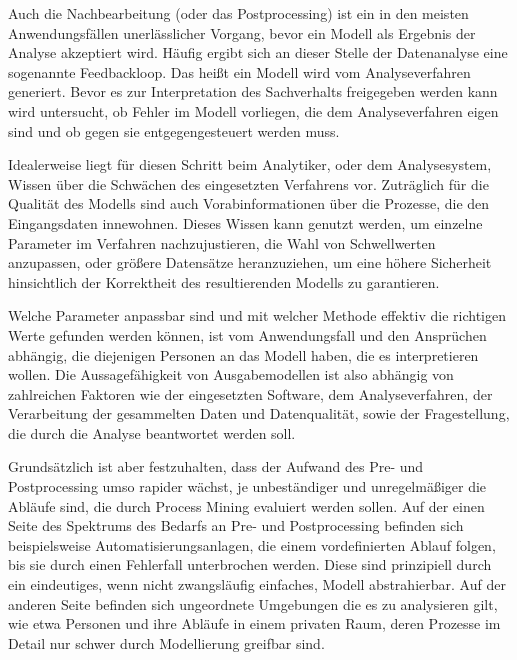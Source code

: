 Auch die Nachbearbeitung (oder das Postprocessing) ist ein in den meisten Anwendungsfällen unerlässlicher Vorgang, bevor ein  Modell als Ergebnis der Analyse akzeptiert wird. Häufig ergibt sich an dieser Stelle der Datenanalyse eine sogenannte Feedbackloop. Das heißt ein Modell wird vom Analyseverfahren generiert. Bevor es zur Interpretation des Sachverhalts freigegeben werden kann wird untersucht, ob Fehler im Modell vorliegen, die dem Analyseverfahren eigen sind und ob gegen sie entgegengesteuert werden muss. 

Idealerweise liegt für diesen Schritt beim Analytiker, oder dem Analysesystem, Wissen über die Schwächen des eingesetzten Verfahrens vor. Zuträglich für die Qualität des Modells sind auch Vorabinformationen über die Prozesse, die den Eingangsdaten innewohnen. Dieses Wissen kann genutzt werden, um einzelne Parameter im Verfahren nachzujustieren, die Wahl von Schwellwerten anzupassen, oder größere Datensätze heranzuziehen, um eine höhere Sicherheit hinsichtlich der Korrektheit des resultierenden Modells zu garantieren.

Welche Parameter anpassbar sind und mit welcher Methode effektiv die richtigen Werte gefunden werden können, ist vom Anwendungsfall und den Ansprüchen abhängig, die diejenigen Personen an das Modell haben, die es interpretieren wollen. Die Aussagefähigkeit von Ausgabemodellen ist also abhängig von zahlreichen Faktoren wie der eingesetzten Software, dem Analyseverfahren, der Verarbeitung der gesammelten Daten und Datenqualität, sowie der Fragestellung, die durch die Analyse beantwortet werden soll.

Grundsätzlich ist aber festzuhalten, dass der Aufwand des Pre- und Postprocessing umso rapider wächst, je unbeständiger und unregelmäßiger die Abläufe sind, die durch Process Mining evaluiert werden sollen. Auf der einen Seite des Spektrums des Bedarfs an Pre- und Postprocessing befinden sich  beispielsweise Automatisierungsanlagen, die einem vordefinierten Ablauf folgen, bis sie durch einen Fehlerfall unterbrochen werden. Diese sind prinzipiell durch ein eindeutiges, wenn nicht zwangsläufig einfaches, Modell abstrahierbar. Auf der anderen Seite befinden sich ungeordnete Umgebungen die es zu analysieren gilt, wie etwa Personen und ihre Abläufe in einem privaten Raum, deren Prozesse im Detail nur schwer durch Modellierung greifbar sind. 